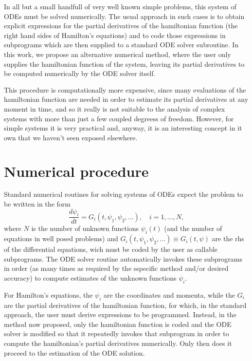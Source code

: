\documentclass{iopart}
\begin{document}
In all but a small handfull of very well known simple problems, this system of
ODEs must be solved numerically. The usual approach in such cases is to obtain
explicit expressions for the partial derivatives of the hamiltonian function
(the right hand sides of Hamilton's equations) and to code those expressions in
subprograms which are then supplied to a standard ODE solver subroutine. In this
work, we propose an alternative numerical method, where the user only supplies
the hamiltonian function of the system, leaving its partial derivatives to be
computed numerically by the ODE solver itself.

This procedure is computationally more expensive, since many evaluations of the
hamiltonian function are needed in order to estimate its partial derivatives at
any moment in time, and so it really is not suitable to the analysis of complex
systems with more than just a few coupled degreess of freedom. However, for
simple systems it is very practical and, anyway, it is an interesting concept in
it own that we haven't seen exposed elsewhere.

\section{Numerical procedure}
Standard numerical routines for solving systems of ODEs expect the problem to be
written in the form
\begin{equation}\label{eq:numheqs}
  \frac{d\psi_i}{dt}=G_i(t, \psi_1, \psi_2, \ldots),\quad i=1, \ldots, N,
\end{equation}
where $N$ is the number of unknown functions $\psi_i(t)$ (and the number of
equations in well posed problems) and $G_i(t, \psi_1, \psi_2, \ldots)\equiv
G_i(t,\psi)$ are the rhs of the differential equations, wich must be coded by
the user as callable subprograms. The ODE
solver routine automatically invokes these subprograms in order (as many times
as required by the sspecific method and/or desired accuracy) to compute
estimates of the unknown functions $\psi_i$.

For Hamilton's equations, the $\psi_i$ are the coordinates and momenta, while
the $G_i$ are the partial derivatives of the hamiltonian function, for which, in
the standard approach, the user must derive expressions to be programmed.
Instead, in the method now proposed, only the hamiltonian function is coded and
the ODE solver is modified so that it repeatedly invokes that subprogram in
order to compute the hamiltonian's partial derivatives numerically. Only then
does it proceed to the estimation of the ODE solution.
\end{document}

